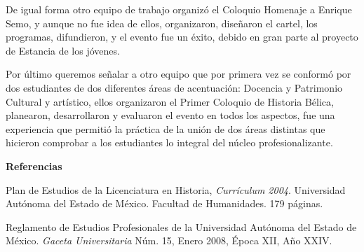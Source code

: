 De igual forma otro equipo de trabajo organizó el Coloquio Homenaje a
Enrique Semo, y aunque no fue idea de ellos, organizaron, diseñaron el
cartel, los programas, difundieron, y el evento fue un éxito, debido en
gran parte al proyecto de Estancia de los jóvenes.


Por último queremos señalar a otro equipo que por primera vez se conformó
por dos estudiantes de dos diferentes áreas de acentuación: Docencia y
Patrimonio Cultural y artístico, ellos organizaron el Primer Coloquio de
Historia Bélica, planearon, desarrollaron y evaluaron el evento en todos
los aspectos, fue una experiencia que permitió la práctica de la unión de
dos áreas distintas que hicieron comprobar a los estudiantes lo integral
del núcleo profesionalizante.


\bigskip
\textbf{Referencias}

Plan de Estudios de la Licenciatura en Historia, \textit{Currículum 2004}.
Universidad Autónoma del Estado de México. Facultad de Humanidades. 179
páginas.


Reglamento de Estudios Profesionales de la Universidad  Autónoma del Estado
de México. \textit{Gaceta Universitaria} Núm. 15, Enero 2008, Época XII, Año
XXIV.
\newpage

